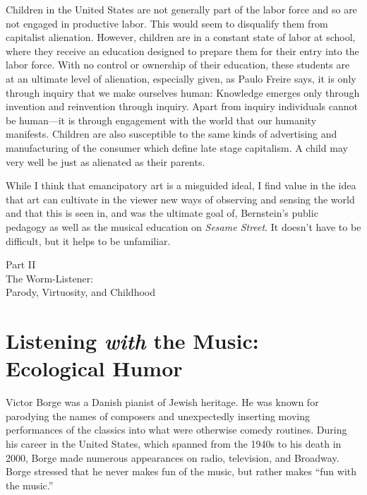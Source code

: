 \documentclass[12pt,letterpaper]{article}
\begin{document}
	Children in the United States are not generally part of the labor force 
	and so are not engaged in productive labor. This would seem to 
	disqualify them from capitalist alienation. However, children are in a 
	constant state of labor at school, where they receive an education 
	designed to prepare them for their entry into the labor force. With no 
	control or ownership of their education, these students are at an 
	ultimate level of alienation, especially given, as Paulo Freire says, 
	it is only through inquiry that we make ourselves human: Knowledge 
	emerges only through invention and reinvention through inquiry. Apart 
	from inquiry individuals cannot be human---it is through engagement 
	with the world that our humanity manifests.\autocite[72]{Freire}  
  	Children are also susceptible to the same kinds of advertising and 
	manufacturing of the consumer which define late stage capitalism.  
	A child may very well be just as alienated as their parents.  

	While I think that emancipatory art is a misguided ideal, I find value 
	in the idea that art can cultivate in the viewer new ways of observing
	and sensing the world and that this is seen in, and was the ultimate
	goal of, Bernstein's public pedagogy as well as the musical education 
	on \textit{Sesame Street}. It doesn't have to be difficult, 
	but it helps to be unfamiliar. 

	\newpage
	\thispagestyle{empty}
	\vspace*{30pt}
	\begin{center}
	{\Huge Part II\\ 
	\Large The Worm-Listener:\\
	Parody, Virtuosity, and Childhood}
	\end{center}


	\newpage
	\section*{Listening \textit{with} the Music: Ecological Humor} 

	Victor Borge was a Danish pianist of Jewish heritage. He was known for 
	parodying the names of composers and unexpectedly inserting moving 
	performances of the classics into what were otherwise comedy 
	routines. During his career in the United 
	States, which spanned from the 1940s to his death in 2000, Borge
	made numerous appearances on radio, television, and Broadway. 
	Borge stressed that he never makes fun of the music, but rather makes 
	``fun with the music.'' \autocite[255]{Garrett}
 
\end{document}
